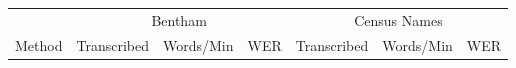\documentclass[ms,electronic,twosidetoc,letterpaper,chaptercenter,parttop,lof,lot]{byumsphd}
\begin{document}
\begin{table}
\centering
\begin{tabular}{| l | c  c  c | c c c |}
  \hline
   & \multicolumn{3}{c|}{Bentham} & \multicolumn{3}{c|}{Census Names}\\
  Method & Transcribed & Words/Min & WER & Transcribed & Words/Min & WER\\
%
  
  \hline		


\end{tabular}
\end{table}
\end{document}
